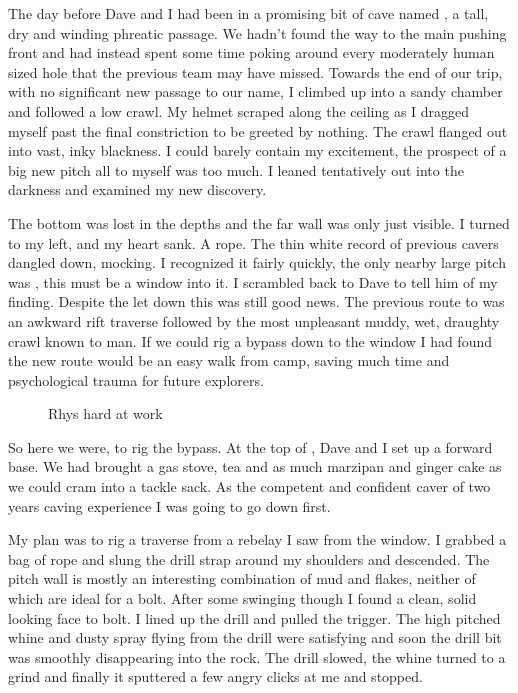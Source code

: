 The day before Dave and I had been in a promising bit of cave named , a tall, dry and winding phreatic passage. We hadn't found the way to the main pushing front and had instead spent some time poking around every moderately human sized hole that the previous team may have missed. Towards the end of our trip, with no significant new passage to our name, I climbed up into a sandy chamber and followed a low crawl. My helmet scraped along the ceiling as I dragged myself past the final constriction to be greeted by nothing. The crawl flanged out into vast, inky blackness. I could barely contain my excitement, the prospect of a big new pitch all to myself was too much. I leaned tentatively out into the darkness and examined my new discovery. 

The bottom was lost in the depths and the far wall was only just visible. I turned to my left, and my heart sank. A rope. The thin white record of previous cavers dangled down, mocking. I recognized it fairly quickly, the only nearby large pitch was , this must be a window into it. I scrambled back to Dave to tell him of my finding. Despite the let down this was still good news. The previous route to  was an awkward rift traverse followed by the most unpleasant muddy, wet, draughty crawl known to man. If we could rig a bypass down to the window I had found the new route would be an easy walk from camp, saving much time and psychological trauma for future explorers.



\begin{figure}[t!]
\checkoddpage \ifoddpage \forcerectofloat \else \forceversofloat \fi
{}
\label{}
\caption{Rhys hard at work }
\end{figure}

So here we were, to rig the bypass. At the top of , Dave and I set up a forward base. We had brought a gas stove, tea and as much marzipan and ginger cake as we could cram into a tackle sack. As the competent and confident caver of two years caving experience I was going to go down first. 

My plan was to rig a traverse from a rebelay I saw from the window. I grabbed a bag of rope and slung the drill strap around my shoulders and descended. The pitch wall is mostly an interesting combination of mud and flakes, neither of which are ideal for a bolt. After some swinging though I found a clean, solid looking face to bolt. I lined up the drill and pulled the trigger. The high pitched whine and dusty spray flying from the drill were satisfying and soon the drill bit was smoothly disappearing into the rock. The drill slowed, the whine turned to a grind and finally it sputtered a few angry clicks at me and stopped. 




